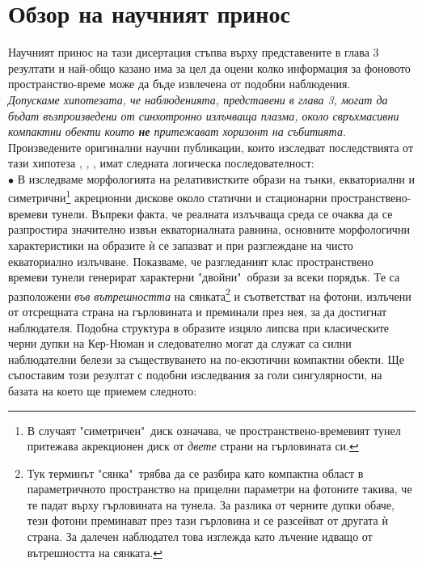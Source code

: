 \section{Обзор на научният принос}

Научният принос на тази дисертация стъпва върху представените в глава 3 резултати и най-общо казано има за цел да оцени колко информация за фоновото пространство-време може да бъде извлечена от подобни наблюдения.\\

 \emph{Допускаме хипотезата, че наблюденията, представени в глава 3, могат да бъдат възпроизведени от синхотронно излъчваща плазма, около свръхмасивни компактни обекти които \textbf{не} притежават хоризонт на събитията}.\\\newline
Произведените оригинални научни публикации, които изследват последствията от тази хипотеза \cite{Deliyski2022}, \cite{Delijski2022}, \cite{Deliyski2023}, \cite{Deliyski2024} имат следната логическа последователност: \\

\noindent$\bullet$ В \cite{Deliyski2022} изследваме морфологията на релативистките образи на тънки, екваториални и симетрични\footnote{ В случаят "симетричен"$\,$ диск означава, че пространствено-времевият тунел притежава акрекционен диск от \emph{двете} страни на гърловината си.} акреционни дискове около статични и стационарни пространствено-времеви тунели. Въпреки факта, че реалната излъчваща среда се очаква да се разпростира значително извън екваториалната равнина, основните морфологични характеристики на образите ѝ се запазват и при разглеждане на чисто екваториално излъчване. Показваме, че разгледаният клас пространствено времеви тунели генерират характерни "двойни"$\,$ образи за всеки порядък. Те са разположени \emph{във вътрешността} на сянката\footnote{Тук терминът "сянка"$\,$ трябва да се разбира като компактна област в параметричното пространство на прицелни параметри на фотоните такива, че те падат върху гърловината на тунела. За разлика от черните дупки обаче, тези фотони преминават през тази гърловина и се разсейват от другата ѝ страна. За далечен наблюдател това изглежда като лъчение идващо от вътрешността на сянката.} и съответстват на фотони, излъчени от отсрещната страна на гърловината и преминали през нея, за да достигнат наблюдателя. Подобна структура в образите изцяло липсва при класическите черни дупки на Кер-Нюман и следователно могат да служат са силни наблюдателни белези за съществуването на по-екзотични компактни обекти. Ще съпоставим този резултат с подобни изследвания за голи сингулярности, на базата на което ще приемем следното:\\

